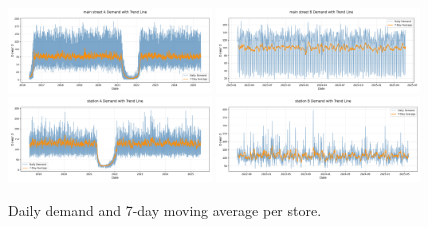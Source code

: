 \begin{figure}[H]
    \centering
    \includegraphics[width=0.48\textwidth]{figures/store_trend_main_street_A.png}
    \includegraphics[width=0.48\textwidth]{figures/store_trend_main_street_B.png}
    \includegraphics[width=0.48\textwidth]{figures/store_trend_station_A.png}
    \includegraphics[width=0.48\textwidth]{figures/store_trend_station_B.png}
    \caption{Daily demand and 7-day moving average per store.}
    \label{fig:trend_lines}
\end{figure}
